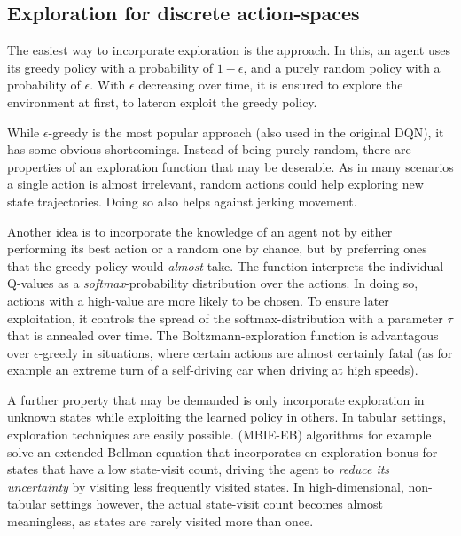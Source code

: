 \subsection{Exploration for discrete action-spaces}

The easiest way to incorporate exploration is the  approach. In this, an agent uses its greedy policy with a probability of $1-\epsilon$, and a purely random policy with a probability of $\epsilon$. With $\epsilon$ decreasing over time, it is ensured to explore the environment at first, to lateron exploit the greedy policy. 

While $\epsilon$-greedy is the most popular approach (also used in the original DQN), it has some obvious shortcomings. Instead of being purely random, there are properties of an exploration function that may be deserable. As in many scenarios a single action is almost irrelevant,  random actions could help exploring new state trajectories. Doing so also helps against jerking movement. 

Another idea is to incorporate the knowledge of an agent not by either performing its best action or a random one by chance, but by preferring ones that the greedy policy would \textit{almost} take. The  function interprets the individual Q-values as a \textit{softmax}-probability distribution over the actions. In doing so, actions with a high-value are more likely to be chosen. To ensure later exploitation, it controls the spread of the softmax-distribution with a parameter $\tau$ that is annealed over time. The Boltzmann-exploration function is advantagous over $\epsilon$-greedy in situations, where certain actions are almost certainly fatal (as for example an extreme turn of a self-driving car when driving at high speeds).

A further property that may be demanded is only incorporate exploration in unknown states while exploiting the learned policy in others. In tabular settings,  exploration techniques are easily possible.  (MBIE-EB) algorithms for example solve an extended Bellman-equation that incorporates en exploration bonus for states that have a low state-visit count, driving the agent to \textit{reduce its uncertainty} by visiting less frequently visited states. In high-dimensional, non-tabular settings however, the actual state-visit count becomes almost meaningless, as states are rarely visited more than once.

